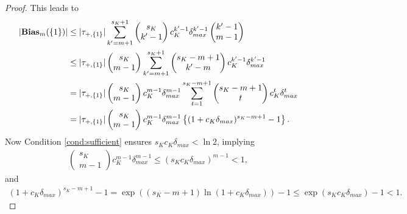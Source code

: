 \documentclass[12pt]{article}
\begin{document}
\begin{proof}
    This leads to 
    \begin{align*}
|\text{\textbf{Bias}}_m(\{1\})| &\le|\tau_{+,\{1\}}| \sum_{k'=m+1} ^ {s_K+1}
    \begin{pmatrix}
    s_K\\
    k'-1
    \end{pmatrix}
    c_K^{k'-1} \delta_{max}^{k'-1} \begin{pmatrix}
    k'-1 \\
    m-1
    \end{pmatrix}\\
    &\le |\tau_{+,\{1\}}| 
    \begin{pmatrix}
    s_K\\
    m-1
    \end{pmatrix}
    \sum_{k'=m+1} ^ {s_K+1}
    \begin{pmatrix}
    s_K-m+1 \\
    k'-m
    \end{pmatrix}
    c_K^{k'-1} \delta_{max}^{k'-1} \\
    & = |\tau_{+,\{1\}}|
    \begin{pmatrix}
    s_K\\
    m-1
    \end{pmatrix}c_K^{m-1} \delta_{max}^{m-1}
    \sum_{t=1} ^ {s_K-m+1}
    \begin{pmatrix}
    s_K-m+1 \\
    t
    \end{pmatrix}
    c_K^{t} \delta_{max}^{t} \\
    &= |\tau_{+,\{1\}}| 
    \begin{pmatrix}
    s_K\\
    m-1
    \end{pmatrix}
    c_K^{m-1}\delta_{max}^{m-1}\left\{(1+c_K\delta_{max})^{s_K-m+1}-1\right\}.
\end{align*}
Now Condition \eqref{cond:sufficient} ensures $s_Kc_K\delta_{max}<\ln2$, implying
\begin{align*}
    \begin{pmatrix}
    s_K\\
    m-1
    \end{pmatrix}c_K^{m-1} \delta_{max}^{m-1}
    \le (s_Kc_K\delta_{max})^{m-1}<1,
    \end{align*}
    and 
    \begin{align*}
    (1+c_K\delta_{max})^{s_K-m+1}-1=\exp((s_K-m+1)\ln(1+c_K\delta_{max}))-1\le \exp(s_Kc_K\delta_{max})-1<1.
\end{align*}


\end{proof}
\end{document}
